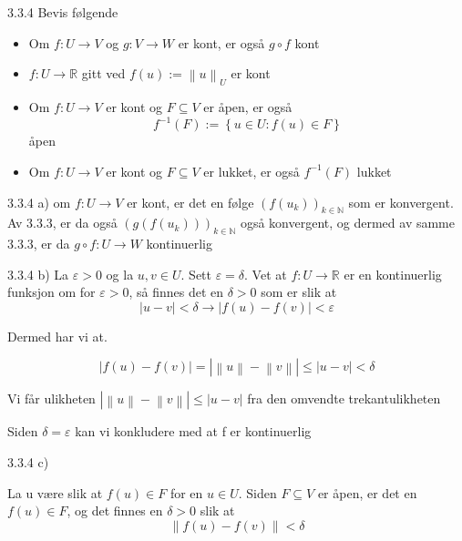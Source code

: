 \documentclass[a4paper,norsk]{article}
\renewcommand{\leq}{\leqslant}
\renewcommand{\epsilon}{\varepsilon}
\begin{document}
\begin{oppgavebox}{3.3.4}{}
Bevis følgende

\begin{itemize}
    \item Om $ f : U \to V  $ og $ g: V \to W $ er kont, er også $ g \circ f  $ kont
    \item $ f:U \to \mathbb{R} $ gitt ved $ f(u) := \left\lVert u \right\rVert _U $ er kont
    \item Om $ f: U \to V $ er kont og $ F \subseteq V $ er åpen, er også 
    \[
        f^{-1}(F) := \left\{ u \in U : f(u) \in F \right\} 
    \]
    åpen
    \item Om $ f: U \to V $ er kont og $ F \subseteq V $ er lukket, er også $ f^{-1}(F)  $  lukket
    
\end{itemize}

\begin{proofbox}{3.3.4 a)}{}
om $ f: U \to V $ er kont, er det en følge $ \left( f(u_k) \right) _{k \in \mathbb{N}} $ som er konvergent. Av 3.3.3, er da også $ \left( g \left( f \left( u_k \right)  \right)  \right)_{k \in \mathbb{N}}  $ også konvergent, og dermed av samme 3.3.3, er da $ g\circ f: U \to W $ kontinuerlig
\end{proofbox}

\begin{proofbox}{3.3.4 b)}{}
La $ \epsilon > 0 $ og la $ u, v \in U $. Sett $ \epsilon = \delta $. Vet at $ f: U \to \mathbb{R} $  er en kontinuerlig funksjon om for $ \epsilon > 0 $, så finnes det en $ \delta > 0 $ som er slik at 
\[
    \left| u - v \right| < \delta \rightarrow  \left| f(u) - f(v) \right| < \epsilon 
\]

Dermed har vi at. 

\[
    \left| f(u) - f(v) \right| = \left| \left\lVert u \right\rVert - \left\lVert v \right\rVert  \right| \leq \left| u - v \right| < \delta
\]

Vi får ulikheten $ \left| \left\lVert u \right\rVert - \left\lVert v \right\rVert  \right| \leq \left| u - v \right|   $ fra den omvendte trekantulikheten

Siden $ \delta = \epsilon  $ kan vi konkludere med at f er kontinuerlig
\end{proofbox}


\begin{proofbox}{3.3.4 c)}{}

La u være slik at $ f(u) \in F $ for en $ u \in U $. Siden $ F \subseteq V $ er åpen, er det en $ f(u) \in F $, og det finnes en $ \delta > 0 $ slik at 
\[
    \left\lVert f(u) - f(v) \right\rVert < \delta
\]


\end{proofbox}
\end{oppgavebox}
\end{document}
